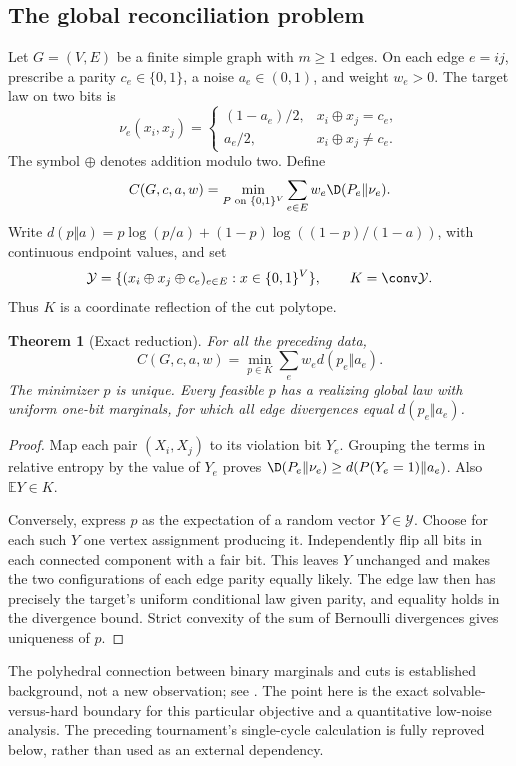 \documentclass[11pt,a4paper]{article}
\newtheorem{theorem}{Theorem}[section]
\theoremstyle{definition}\newtheorem{definition}[theorem]{Definition}
\theoremstyle{remark}\newtheorem{remark}[theorem]{Remark}
\newcommand{\E}{\mathbb E}\newcommand{\one}{\mathbf 1}\newcommand{\1}{\mathbf 1}
\numberwithin{equation}{section}
\begin{document}
\subsection{The global reconciliation problem}\label{R08-sec-1}
Let $G=(V,E)$ be a finite simple graph with $m\ge1$ edges. On each edge $e=ij$, prescribe a parity $c_e\in\{0,1\}$, a noise $a_e\in(0,1)$, and weight $w_e>0$. The target law on two bits is
\[
 \nu_e(x_i,x_j)=\begin{cases}(1-a_e)/2,&x_i\oplus x_j=c_e,\\a_e/2,&x_i\oplus x_j\ne c_e.\end{cases}
\]
The symbol $\oplus$ denotes addition modulo two. Define
\begin{equation}\label{R08-C}
 C(G,c,a,w)=\min_{P\text{ on }\{0,1\}^V}\sum_{e\in E}w_e\D(P_e\Vert\nu_e).
\end{equation}
Write $d(p\Vert a)=p\log(p/a)+(1-p)\log((1-p)/(1-a))$, with continuous endpoint values, and set
\[
 \mathcal Y=\{(x_i\oplus x_j\oplus c_e)_{e\in E}:x\in\{0,1\}^V\},\qquad K=\conv\mathcal Y.
\]
Thus $K$ is a coordinate reflection of the cut polytope.

\begin{theorem}[Exact reduction]\label{R08-reduction}
For all the preceding data,
\begin{equation}\label{R08-cutopt}
 C(G,c,a,w)=\min_{p\in K}\sum_e w_e d(p_e\Vert a_e).
\end{equation}
The minimizer $p$ is unique. Every feasible $p$ has a realizing global law with uniform one-bit marginals, for which all edge divergences equal $d(p_e\Vert a_e)$.
\end{theorem}
\begin{proof}
Map each pair $(X_i,X_j)$ to its violation bit $Y_e$. Grouping the terms in relative entropy by the value of $Y_e$ proves $\D(P_e\Vert\nu_e)\ge d(P(Y_e=1)\Vert a_e)$. Also $\E Y\in K$.

Conversely, express $p$ as the expectation of a random vector $Y\in\mathcal Y$. Choose for each such $Y$ one vertex assignment producing it. Independently flip all bits in each connected component with a fair bit. This leaves $Y$ unchanged and makes the two configurations of each edge parity equally likely. The edge law then has precisely the target's uniform conditional law given parity, and equality holds in the divergence bound. Strict convexity of the sum of Bernoulli divergences gives uniqueness of $p$.
\end{proof}

The polyhedral connection between binary marginals and cuts is established background, not a new observation; see \cite{ref074}. The point here is the exact solvable-versus-hard boundary for this particular objective and a quantitative low-noise analysis. The preceding tournament's single-cycle calculation is fully reproved below, rather than used as an external dependency.
\end{document}
